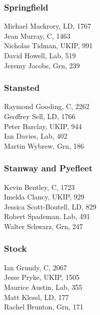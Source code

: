 \documentclass[a4paper,openany,10pt]{book}
\begin{document}
\subsubsection*{Springfield}



Michael Mackrory, LD, 1767\\
Jean Murray, C, 1463\\
Nicholas Tidman, UKIP, 991\\
David Howell, Lab, 519\\
Jeremy Jacobs, Grn, 239\\


\subsubsection*{Stansted}



Raymond Gooding, C, 2262\\
Geoffrey Sell, LD, 1766\\
Peter Barclay, UKIP, 944\\
Ian Davies, Lab, 402\\
Martin Wybrew, Grn, 186\\


\subsubsection*{Stanway and Pyefleet}



Kevin Bentley, C, 1723\\
Imelda Clancy, UKIP, 929\\
Jessica Scott-Boutell, LD, 829\\
Robert Spademan, Lab, 491\\
Walter Schwarz, Grn, 247\\


\subsubsection*{Stock}



Ian Grundy, C, 2067\\
Jesse Pryke, UKIP, 1505\\
Maurice Austin, Lab, 355\\
Matt Klesel, LD, 177\\
Rachel Brunton, Grn, 171\\
\end{document}
